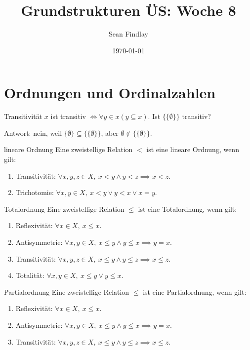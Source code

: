 \documentclass[12pt]{article}
\title{Grundstrukturen ÜS: Woche 8}
\author{Sean Findlay}
\date{\today}
\begin{document}
\maketitle

\section{Ordnungen und Ordinalzahlen}

\begin{exercise}{Transitivität}{}
    $x$ ist transitiv $\iff \forall y \in x (y \subseteq x)$. Ist $\{\{\emptyset\}\}$ transitiv?
\end{exercise}

Antwort: nein, weil $\{\emptyset\} \subseteq \{\{\emptyset\}\}$, aber $\emptyset \notin \{\{\emptyset\}\}$.

\begin{definition}{lineare Ordnung}{}
    Eine zweistellige Relation $<$ ist eine lineare Ordnung, wenn gilt:
    \begin{enumerate}
        \item Transitivität: $\forall x, y, z \in X, \ x < y \land y < z \implies x < z$.
        \item Trichotomie: $\forall x, y \in X, \ x < y \lor y < x \lor x = y$.
    \end{enumerate}
\end{definition}

\begin{definition}{Totalordnung}{}
    Eine zweistellige Relation $\leq$ ist eine Totalordnung, wenn gilt:

    \begin{enumerate}
        \item Reflexivität: $\forall x \in X, \ x \leq x$.
        \item Antisymmetrie: $\forall x, y \in X, \ x \leq y \land y \leq x \implies y = x$.
        \item Transitivität: $\forall x, y, z \in X, \ x \leq y \land y \leq z \implies x \leq z$.
        \item Totalität: $\forall x, y \in X, \ x \leq y \lor y \leq x$.
    \end{enumerate}
\end{definition}

\begin{definition}{Partialordnung}{}
    Eine zweistellige Relation $\leq$ ist eine Partialordnung, wenn gilt:

    \begin{enumerate}
        \item Reflexivität: $\forall x \in X, \ x \leq x$.
        \item Antisymmetrie: $\forall x, y \in X, \ x \leq y \land y \leq x \implies y = x$.
        \item Transitivität: $\forall x, y, z \in X, \ x \leq y \land y \leq z \implies x \leq z$.
    \end{enumerate}
\end{definition}
\end{document}
